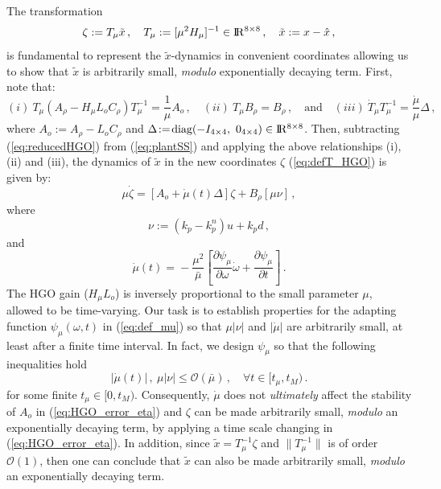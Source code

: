\documentclass[letterpaper, 10 pt, conference]{ieeeconf}  %
\def\re{{\rm I}\! {\rm R}}
\theoremstyle{plain}
\theoremstyle{definition}
\theoremstyle{remark}
\begin{document}
The transformation \cite{OK:97}
%
\begin{equation}
\zeta:=T_{\mu}\tilde{x}\,, \quad T_\mu:=[\mu^2
H_\mu]^{-1} \in \re^{8 \times 8}\,, \quad \tilde{x}:= x-\hat{x}\,,\label{eq:defT_HGO}
\end{equation}
%
is fundamental to represent the $\tilde{x}$-dynamics in 
convenient coordinates allowing us to show that $\tilde{x}$ is
arbitrarily small, {\em modulo} exponentially decaying term. First,
note that:
%
$$(i) \ T_\mu(A_\rho-H_\mu L_o
C_\rho)T_\mu^{-1}\!=\!\frac{1}{\mu}A_o\,, \quad (ii) \ T_\mu B_\rho\!=\!B_\rho\,, \quad \mbox{and} \quad
(iii) \ \dot{T}_\mu T_\mu^{-1}\!=\!\frac{\dot{\mu}}{\mu}
\Delta\,,$$
%
where $A_o\!:=\!A_\rho\!-\!L_o C_\rho$ and
$\Delta\!:=\!\mbox{diag}(-I_{4 \times 4}, \ 0_{4 \times 4}) \in \re^{8 \times 8}$.
%
Then, subtracting (\ref{eq:reducedHGO}) from
(\ref{eq:plantSS}) and applying the above
relationships (i),
(ii) and (iii), the dynamics of $\tilde{x}$ 
in the new coordinates $\zeta$ (\ref{eq:defT_HGO}) is given by:
%
\begin{equation}
\mu \dot{\zeta} = [A_o+ \dot{\mu}(t) \Delta] \zeta + B_\rho [\mu
\nu]\,, \label{eq:HGO_error_eta}
\end{equation}
%
where %
%
\begin{equation}
\nu:=(k_p-k_p^n)u+k_p d\,,\label{eq:def_nu}
\end{equation}
%
and
%
\begin{equation}
\dot{\mu}(t)\!=\!-\frac{\mu^2}{\bar{\mu}} \left[\frac{\partial
\psi_\mu}{\partial \omega} \dot{\omega}+\frac{\partial
\psi_\mu}{\partial t}\right]\,. \label{eq:def_mudot}
\end{equation}
%
The HGO gain ($H_\mu L_o$) is inversely proportional to the small parameter $\mu$,
allowed to be time-varying. %
Our task is to establish properties for the adapting
function $\psi_\mu(\omega,t)$ in (\ref{eq:def_mu}) so that $\mu
|\nu|$ and $|\dot{\mu}|$ are arbitrarily small, at least after a
finite time interval. In fact, we design $\psi_\mu$ so that the following inequalities hold
%
\begin{equation}
|\dot{\mu}(t)|\,, \ \mu |\nu| \leq \mathcal{O}(\bar{\mu})\,, \quad
\forall t \in [t_\mu,t_M)\,. \label{eq:mudotmunu}
\end{equation}
%
for  some finite $t_\mu \in [0,t_M)$.  Consequently, $\dot{\mu}$ does not {\em
ultimately} affect the stability of $A_o$ in
(\ref{eq:HGO_error_eta}) and $\zeta$  can be made
arbitrarily small, {\em modulo} an exponentially decaying term, by applying a time scale changing in (\ref{eq:HGO_error_eta}). In addition, since $\tilde{x} = T_\mu^{-1} \zeta$ and $\|T_\mu^{-1}\|$ is of order $\mathcal{O}(1)$, then one can conclude that $\tilde{x}$ can also be made
arbitrarily small, {\em modulo} an exponentially decaying term.
\end{document}
